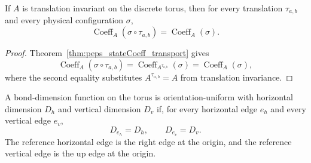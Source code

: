 \begin{theorem}%
    \label{thm:peps_stateCoeff_translationInvariant}
    \leanok
    If $A$ is translation invariant on the discrete torus, then for every
    translation $\tau_{a,b}$ and every physical configuration $\sigma$,
    \[
        \operatorname{Coeff}_{A}(\sigma\circ\tau_{a,b})
        =
        \operatorname{Coeff}_{A}(\sigma).
    \]
\end{theorem}
\begin{proof}\leanok
    Theorem~\ref{thm:peps_stateCoeff_transport} gives
    \[
        \operatorname{Coeff}_{A}(\sigma\circ\tau_{a,b})
        =
        \operatorname{Coeff}_{A^{\tau_{a,b}}}(\sigma)
        =
        \operatorname{Coeff}_{A}(\sigma),
    \]
    where the second equality substitutes $A^{\tau_{a,b}}=A$ from translation
    invariance.
\end{proof}

\begin{definition}%
    \label{def:peps_torus_uniform_bond_dim}
    \leanok
    A bond-dimension function on the torus is orientation-uniform with
    horizontal dimension $D_h$ and vertical dimension $D_v$ if, for every
    horizontal edge $e_h$ and every vertical edge $e_v$,
    \[
        D_{e_h}=D_h,
        \qquad
        D_{e_v}=D_v.
    \]
    The reference horizontal edge is the right edge at the origin, and the
    reference vertical edge is the up edge at the origin.
\end{definition}

